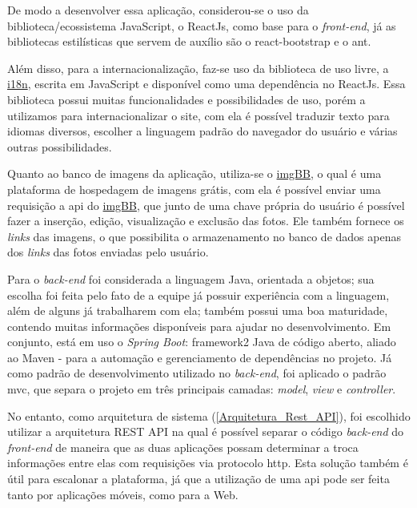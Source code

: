De modo a desenvolver essa aplicação, considerou-se o uso da biblioteca/ecossistema JavaScript, o ReactJs, como base para o \textsl{\gls{front-end}}, já as bibliotecas estilísticas que servem de auxílio são o \gls{react-bootstrap} e o \gls{ant}.

Além disso, para a internacionalização, faz-se uso da biblioteca de uso livre, a  \href{https://www.i18next.com}{i18n}, escrita em JavaScript e disponível como uma dependência no ReactJs. Essa biblioteca possui muitas funcionalidades e possibilidades de uso, porém a utilizamos para internacionalizar o site, com ela é possível traduzir texto para idiomas diversos, escolher a linguagem padrão do navegador do usuário e várias outras possibilidades.

Quanto ao banco de imagens da aplicação, utiliza-se o \href{https://pt-br.imgbb.com}{imgBB}, o qual é uma plataforma de hospedagem de imagens grátis, com ela é possível enviar uma requisição a \acs{api} do \href{https://pt-br.imgbb.com}{imgBB}, que junto de uma chave própria do usuário é possível fazer a inserção, edição, visualização e exclusão das fotos. Ele também fornece os \textsl{links} das imagens, o que possibilita o armazenamento no banco de dados apenas dos \textsl{links} das fotos enviadas pelo usuário.

Para o \textsl{\gls{back-end}} foi considerada a linguagem Java, orientada a objetos; sua escolha foi feita pelo fato de a equipe já possuir experiência com a linguagem, além de alguns já trabalharem com ela; também possui uma boa maturidade, contendo muitas informações disponíveis para ajudar no desenvolvimento. Em conjunto, está em uso o \textit{Spring Boot}: \gls{framework2} Java de código aberto, aliado ao \gls{Maven} - para a automação e gerenciamento de dependências no projeto.  Já como padrão de desenvolvimento utilizado no  \textsl{\gls{back-end}}, foi aplicado o padrão \acs{mvc}, que separa o projeto em três principais camadas: \textit{model}, \textit{view} e \textit{controller}.

No entanto, como arquitetura de sistema (\autoref{Arquitetura_Rest_API}), foi escolhido utilizar a arquitetura \gls{REST API} na qual é possível separar o código \textsl{\gls{back-end}} do \textsl{\gls{front-end}} de maneira que as duas aplicações possam determinar a troca informações entre elas com requisições via protocolo \acs{http}. Esta solução também é útil para escalonar a plataforma, já que a utilização de uma \acs{api} pode ser feita tanto por aplicações móveis, como para a Web.

